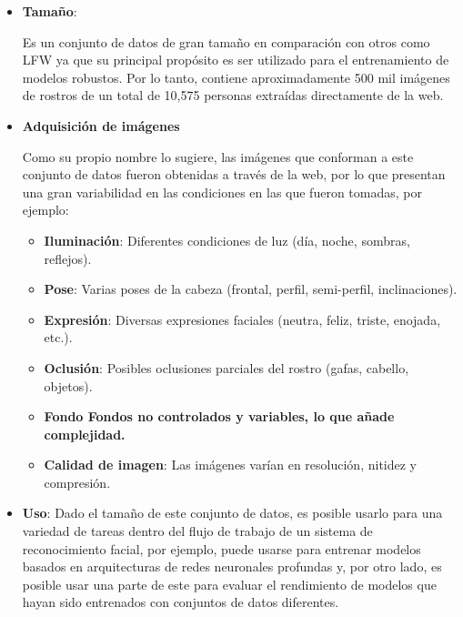 \begin{itemize}
	
	\item \textbf{Tamaño}:
	
	Es un conjunto de datos de gran tamaño en comparación con otros como LFW ya que su principal propósito es ser utilizado para el entrenamiento de modelos robustos. Por lo tanto, contiene aproximadamente 500 mil imágenes de rostros de un total de 10,575 personas extraídas directamente de la web.
	
	\item \textbf{Adquisición de imágenes}
	
	Como su propio nombre lo sugiere, las imágenes que conforman a este conjunto de datos fueron obtenidas a través de la web, por lo que presentan una gran variabilidad en las condiciones en las que fueron tomadas, por ejemplo:
	
	\begin{itemize}
		
		\item \textbf{Iluminación}: Diferentes condiciones de luz (día, noche, sombras, reflejos).
		
		\item \textbf{Pose}: Varias poses de la cabeza (frontal, perfil, semi-perfil, inclinaciones).
		
		\item \textbf{Expresión}: Diversas expresiones faciales (neutra, feliz, triste, enojada, etc.).		
		
		\item \textbf{Oclusión}: Posibles oclusiones parciales del rostro (gafas, cabello, objetos).
		
		\item \textbf{Fondo Fondos no controlados y variables, lo que añade complejidad.}
		
		\item \textbf{Calidad de imagen}: Las imágenes varían en resolución, nitidez y compresión.
						
			
		
	\end{itemize}
	
	
	\item \textbf{Uso}: Dado el tamaño de este conjunto de datos, es posible usarlo para una variedad de tareas dentro del flujo de trabajo de un sistema de reconocimiento facial, por ejemplo, puede usarse para entrenar modelos basados en arquitecturas de redes neuronales profundas y, por otro lado, es posible usar una parte de este para evaluar el rendimiento de modelos que hayan sido entrenados con conjuntos de datos diferentes.
	
	
\end{itemize}

